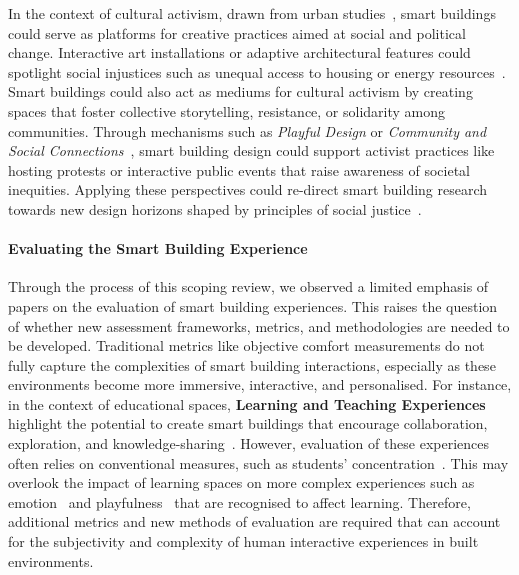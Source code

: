 In the context of cultural activism, drawn from urban studies~\cite{buser2013cultural}, smart buildings could serve as platforms for creative practices aimed at social and political change. Interactive art installations or adaptive architectural features could spotlight social injustices such as unequal access to housing or energy resources~\cite{loszchuk2020combining}. Smart buildings could also act as mediums for cultural activism by creating spaces that foster collective storytelling, resistance, or solidarity among communities. Through mechanisms such as \textit{Playful Design} or \textit{Community and Social Connections}~\cite{shepard2011sentient}, smart building design could support activist practices like hosting protests or interactive public events that raise awareness of societal inequities. Applying these perspectives could re-direct smart building research towards new design horizons shaped by principles of social justice~\cite{dombrowski2016social}. 


\paragraph{Evaluating the Smart Building Experience} 
Through the process of this scoping review, we observed a limited emphasis of papers on the evaluation of smart building experiences. This raises the question of whether new assessment frameworks, metrics, and methodologies are needed to be developed. Traditional metrics like objective comfort measurements do not fully capture the complexities of smart building interactions, especially as these environments become more immersive, interactive, and personalised. For instance, in the context of educational spaces, \textbf{Learning and Teaching Experiences} highlight the potential to create smart buildings that encourage collaboration, exploration, and knowledge-sharing~\cite{lui2014supporting}. However, evaluation of these experiences often relies on conventional measures, such as students' concentration~\cite{korozi2019shaping}. This may overlook the impact of learning spaces on more complex experiences such as emotion~\cite{gao2020n, gao2022understanding} and playfulness~\cite{ccetin2024learning} that are recognised to affect learning. Therefore, additional metrics and new methods of evaluation are required that can account for the subjectivity and complexity of human interactive experiences in built environments. 


